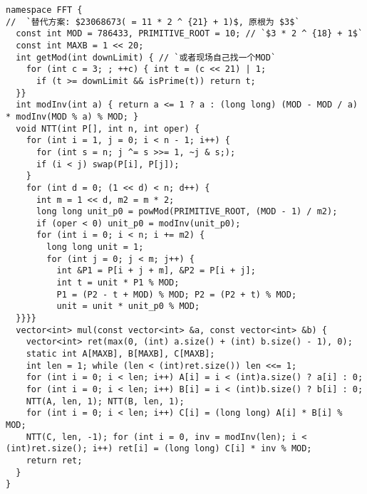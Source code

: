 \begin{lstlisting}
namespace FFT {
//  `替代方案: $23068673( = 11 * 2 ^ {21} + 1)$, 原根为 $3$`
  const int MOD = 786433, PRIMITIVE_ROOT = 10; // `$3 * 2 ^ {18} + 1$`
  const int MAXB = 1 << 20;
  int getMod(int downLimit) { // `或者现场自己找一个MOD`
    for (int c = 3; ; ++c) { int t = (c << 21) | 1;
      if (t >= downLimit && isPrime(t)) return t;
  }}
  int modInv(int a) { return a <= 1 ? a : (long long) (MOD - MOD / a) * modInv(MOD % a) % MOD; }
  void NTT(int P[], int n, int oper) {
    for (int i = 1, j = 0; i < n - 1; i++) {
      for (int s = n; j ^= s >>= 1, ~j & s;);
      if (i < j) swap(P[i], P[j]);
    }
    for (int d = 0; (1 << d) < n; d++) {
      int m = 1 << d, m2 = m * 2;
      long long unit_p0 = powMod(PRIMITIVE_ROOT, (MOD - 1) / m2);
      if (oper < 0) unit_p0 = modInv(unit_p0);
      for (int i = 0; i < n; i += m2) {
        long long unit = 1;
        for (int j = 0; j < m; j++) {
          int &P1 = P[i + j + m], &P2 = P[i + j];
          int t = unit * P1 % MOD;
          P1 = (P2 - t + MOD) % MOD; P2 = (P2 + t) % MOD;
          unit = unit * unit_p0 % MOD;
  }}}}
  vector<int> mul(const vector<int> &a, const vector<int> &b) {
    vector<int> ret(max(0, (int) a.size() + (int) b.size() - 1), 0);
    static int A[MAXB], B[MAXB], C[MAXB];
    int len = 1; while (len < (int)ret.size()) len <<= 1;
    for (int i = 0; i < len; i++) A[i] = i < (int)a.size() ? a[i] : 0;
    for (int i = 0; i < len; i++) B[i] = i < (int)b.size() ? b[i] : 0;
    NTT(A, len, 1); NTT(B, len, 1);
    for (int i = 0; i < len; i++) C[i] = (long long) A[i] * B[i] % MOD;
    NTT(C, len, -1); for (int i = 0, inv = modInv(len); i < (int)ret.size(); i++) ret[i] = (long long) C[i] * inv % MOD;
    return ret;
  }
}
\end{lstlisting}